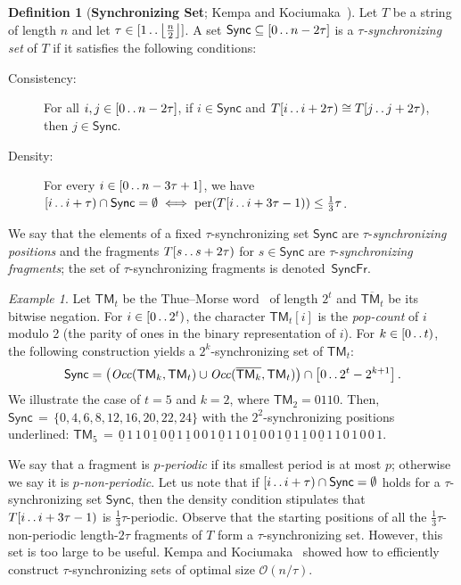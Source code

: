 \documentclass[a4paper]{article}
\theoremstyle{definition}
\newtheorem{definition}[theorem]{Definition}
\theoremstyle{remark}
\newtheorem{example}[theorem]{Example}
\newcommand{\TM}{\mathsf{TM}}
\newcommand{\floor}[1]{\left\lfloor #1 \right\rfloor}
\newcommand{\sub}{\subseteq}
\newcommand{\dd}{\mathinner{\ldotp\ldotp}}
\DeclareMathOperator{\per}{per}
\newcommand{\Occ}{\mathit{Occ}}
\newcommand{\Oh}{\mathcal{O}}
\renewcommand{\S}{\mathsf{Sync}}
\renewcommand{\S}{\mathsf{Sync}}
\newcommand{\SF}{\mathsf{SyncFr}}
\begin{document}
\begin{definition}[\textbf{Synchronizing Set}; Kempa and Kociumaka~\cite{Kempa2019}]
  Let $T$ be a string of length $n$ and let $\tau\in [1\dd \floor{\frac{n}{2}}]$.
  A set $\S\sub [0\dd n-2\tau]$ is a \emph{$\tau$-synchronizing set} of $T$ if it satisfies the following conditions:
  \begin{description}
\item[Consistency:] For all $i,j\in [0\dd n-2\tau]$, if $i\in \S$ and $T[i\dd i+2\tau)\cong T[j\dd j+2\tau)$, then $j\in \S$.
\item[Density:]
For every $i\in [0\dd n-3\tau+1]$, we have $[i\dd i+\tau)\cap \S = \emptyset\;\Longleftrightarrow\; \per(T[i\dd i+3\tau-1)) \le \tfrac13\tau$.
\end{description}
We say that the elements of a fixed $\tau$-synchronizing set $\S$ are $\tau$-\emph{synchronizing positions} and the fragments $T[s\dd s+2\tau)$ for $s\in \S$ are $\tau$-\emph{synchronizing fragments}; the set of $\tau$-synchronizing fragments is denoted~$\SF$.
\end{definition}

\begin{example}
  Let  $\TM_t$ be the Thue--Morse word~\cite{Thue2} of length $2^t$ and $\overline{\TM_t}$ be its bitwise negation.
  For $i\in [0\dd 2^t)$, the character $\TM_t[i]$ is the \emph{pop-count} of $i$ modulo 2 (the parity of ones in the binary representation of $i$).
  For $k\in [0\dd t)$, the following construction yields a $2^{k}$-synchronizing set of $\TM_t$:
  \[\S=\left(\Occ(\TM_k,\TM_t)\cup \Occ(\overline{\TM_k},\TM_t)\right)\cap \left[0\dd 2^t-2^{k+1}\right].\]
  We illustrate the case of $t=5$ and $k=2$, where $\TM_{2}=0110$.
  Then,  $\S\,=\, \{0,4,6,8,12,16,20,22,24\}$ with the $2^2$-synchronizing positions underlined:
  $\TM_5\,=\,
  \underline{0}\,1\,1\,0\,\underline{1}\,0\,\underline{0}\,1\,\underline{1}\,0\,0\,1\,
  \underline{0}\,1\,1\,0\,\underline{1}\,0\,0\,1\,\underline{0}\,1\,\underline{1}\,0\,
  \underline{0}\,1\,1\,0\,1\,0\,0\,1$.
  \end{example}

We say that a fragment is \emph{$p$-periodic} if its smallest period is at most $p$; otherwise
we say it is \emph{$p$-non-periodic}.
Let us note that if $[i\dd i+\tau)\cap \S=\emptyset$ holds for a $\tau$-synchronizing set $\S$,
then the density condition stipulates that $T[i\dd i+3\tau-1)$ is $\frac13\tau$-periodic.
Observe that the starting positions of all the $\frac13\tau$-non-periodic length-$2\tau$ fragments of $T$
form a $\tau$-synchronizing set. However, this set is too large to be useful. 
Kempa and Kociumaka~\cite{Kempa2019} showed how to efficiently construct $\tau$-synchronizing sets
of optimal size $\Oh(n/\tau)$.
\end{document}
